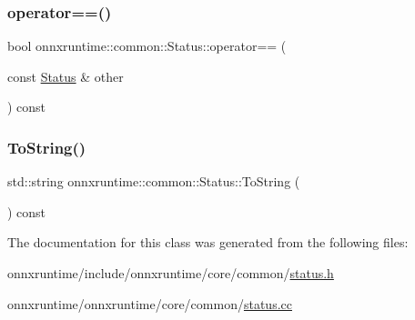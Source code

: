 \subsubsection{\texorpdfstring{operator==()}{operator==()}}
{\footnotesize\ttfamily bool onnxruntime\+::common\+::\+Status\+::operator== (\begin{DoxyParamCaption}\item[{const \mbox{\hyperlink{classonnxruntime_1_1common_1_1Status}{Status}} \&}]{other }\end{DoxyParamCaption}) const\hspace{0.3cm}{\ttfamily [inline]}}

\mbox{\label{classonnxruntime_1_1common_1_1Status_a30deaaae9d10c455b820c1ad990363d8}} 
\subsubsection{\texorpdfstring{To\+String()}{ToString()}}
{\footnotesize\ttfamily std\+::string onnxruntime\+::common\+::\+Status\+::\+To\+String (\begin{DoxyParamCaption}{ }\end{DoxyParamCaption}) const}



The documentation for this class was generated from the following files\+:\begin{DoxyCompactItemize}
\item 
onnxruntime/include/onnxruntime/core/common/\mbox{\hyperlink{status_8h}{status.\+h}}\item 
onnxruntime/onnxruntime/core/common/\mbox{\hyperlink{status_8cc}{status.\+cc}}\end{DoxyCompactItemize}
